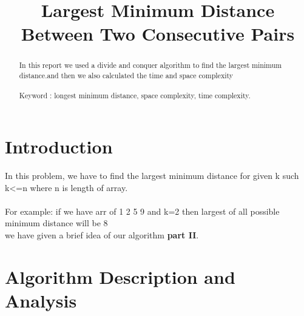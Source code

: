 \documentclass[conference]{IEEEtran}
\begin{document}
\title{
Largest Minimum Distance Between Two Consecutive Pairs\\
}

\author{
\and
{}
\and
{}
}

\maketitle

\noindent \begin{abstract}

In this report we used a divide and conquer algorithm to find the largest minimum distance.and then we also calculated the time and space complexity\\\\
Keyword : longest minimum distance, space complexity, time complexity.

\end{abstract}


\section{\textbf{Introduction}}
\noindent In this problem, we have to find the largest minimum distance for given k such k<=n where n is length of array. \\\\

\noindent For example: if we have arr of 1 2 5 9 and k=2 then largest of all possible minimum distance will be 8\\

\noindent we have given a brief idea of our algorithm \textbf{part II}.\\


\section{\textbf {Algorithm Description and Analysis}}
\end{document}
